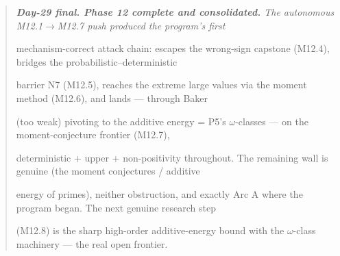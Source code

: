 \documentclass[10pt]{article}
\begin{document}
\begin{quote}\itshape
\textbf{Day-29 final. Phase 12 complete and consolidated.} The autonomous M12.1\ensuremath{\to}M12.7 push produced the program's first\par
mechanism-correct attack chain: escapes the wrong-sign capstone (M12.4), bridges the probabilistic--deterministic\par
barrier N7 (M12.5), reaches the extreme large values via the moment method (M12.6), and lands --- through Baker\par
(too weak) pivoting to the additive energy = P5's \ensuremath{\omega}-classes --- on the moment-conjecture frontier (M12.7),\par
deterministic + upper + non-positivity throughout. The remaining wall is genuine (the moment conjectures / additive\par
energy of primes), neither obstruction, and exactly Arc A where the program began. The next genuine research step\par
(M12.8) is the sharp high-order additive-energy bound with the \ensuremath{\omega}-class machinery --- the real open frontier.\par
\end{quote}
\end{document}
